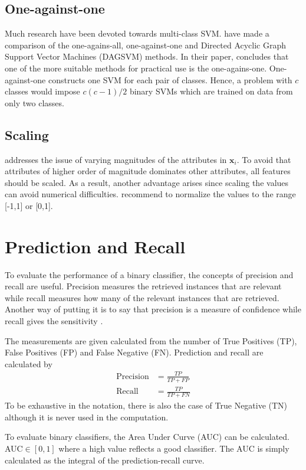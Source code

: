 \subsection{One-against-one}
Much research have been devoted towards multi-class SVM. \citet{Hsu2002} have made a comparison of the one-agains-all, one-against-one and Directed Acyclic Graph Support Vector Machines (DAGSVM) methods. In their paper, \citet{Hsu2002} concludes that one of the more suitable methods for practical use is the one-agains-one. One-against-one constructs one SVM for each pair of classes. Hence, a problem with $c$ classes would impose $c(c-1)/2$ binary SVMs which are trained on data from only two classes.

\subsection{Scaling \label{scale}}
\citet{Hsu10apractical} addresses the issue of varying magnitudes of the attributes in $\bm{x}_i$. To avoid that attributes of higher order of magnitude dominates other attributes, all features should be scaled. As a result, another advantage arises since scaling the values can avoid numerical difficulties. \citet{Hsu10apractical} recommend to normalize the values to the range [-1,1] or [0,1].

\section{Prediction and Recall}
To evaluate the performance of a binary classifier, the concepts of precision and recall are useful. Precision measures the retrieved instances that are relevant while recall measures how many of the relevant instances that are retrieved. Another way of putting it is to say that precision is a measure of confidence while recall gives the sensitivity \citep{powers2011}.

The measurements are given calculated from the number of True Positives (TP), False Positives (FP) and False Negative (FN). Prediction and recall are calculated by \citep{powers2011}
\begin{align}
\text{Precision}&=\frac{TP}{TP+FP}\\
\text{Recall}&=\frac{TP}{TP+FN}
\end{align}
To be exhaustive in the notation, there is also the case of True Negative (TN) although it is never used in the computation.

To evaluate binary classifiers, the Area Under Curve (AUC) can be calculated. AUC$\in[0,1]$ where a high value reflects a good classifier. The AUC is simply calculated as the integral of the prediction-recall curve.

